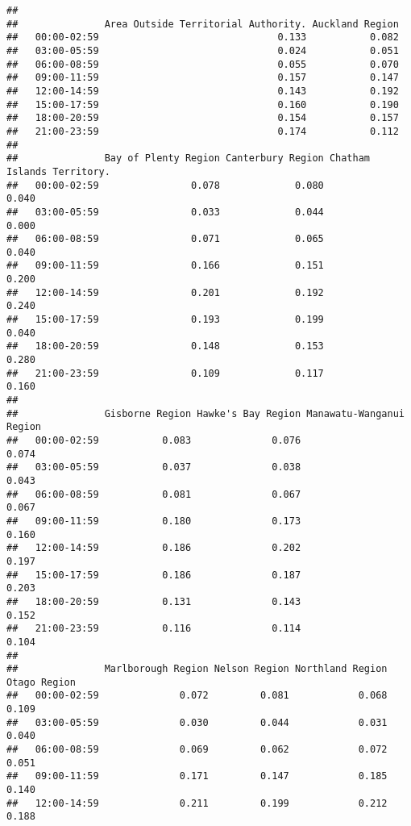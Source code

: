 \documentclass[
  10pt,
]{article}
\begin{document}
\begin{verbatim}
##              
##               Area Outside Territorial Authority. Auckland Region
##   00:00-02:59                               0.133           0.082
##   03:00-05:59                               0.024           0.051
##   06:00-08:59                               0.055           0.070
##   09:00-11:59                               0.157           0.147
##   12:00-14:59                               0.143           0.192
##   15:00-17:59                               0.160           0.190
##   18:00-20:59                               0.154           0.157
##   21:00-23:59                               0.174           0.112
##              
##               Bay of Plenty Region Canterbury Region Chatham Islands Territory.
##   00:00-02:59                0.078             0.080                      0.040
##   03:00-05:59                0.033             0.044                      0.000
##   06:00-08:59                0.071             0.065                      0.040
##   09:00-11:59                0.166             0.151                      0.200
##   12:00-14:59                0.201             0.192                      0.240
##   15:00-17:59                0.193             0.199                      0.040
##   18:00-20:59                0.148             0.153                      0.280
##   21:00-23:59                0.109             0.117                      0.160
##              
##               Gisborne Region Hawke's Bay Region Manawatu-Wanganui Region
##   00:00-02:59           0.083              0.076                    0.074
##   03:00-05:59           0.037              0.038                    0.043
##   06:00-08:59           0.081              0.067                    0.067
##   09:00-11:59           0.180              0.173                    0.160
##   12:00-14:59           0.186              0.202                    0.197
##   15:00-17:59           0.186              0.187                    0.203
##   18:00-20:59           0.131              0.143                    0.152
##   21:00-23:59           0.116              0.114                    0.104
##              
##               Marlborough Region Nelson Region Northland Region Otago Region
##   00:00-02:59              0.072         0.081            0.068        0.109
##   03:00-05:59              0.030         0.044            0.031        0.040
##   06:00-08:59              0.069         0.062            0.072        0.051
##   09:00-11:59              0.171         0.147            0.185        0.140
##   12:00-14:59              0.211         0.199            0.212        0.188

\end{verbatim}
\end{document}
